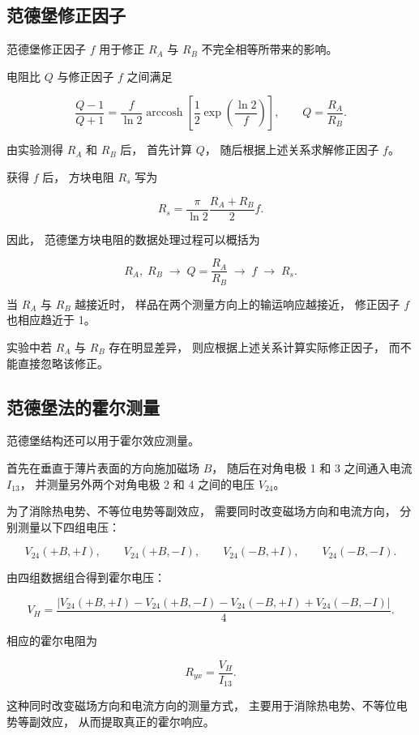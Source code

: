 \documentclass[openany]{book}
\theoremstyle{mydefinition}
\theoremstyle{myplain}
\begin{document}
\subsection{范德堡修正因子}

范德堡修正因子 \(f\)
用于修正 \(R_A\) 与 \(R_B\) 不完全相等所带来的影响。

电阻比 \(Q\) 与修正因子 \(f\) 之间满足

\[
\frac{Q-1}{Q+1}
=
\frac{f}{\ln 2}
\operatorname{arccosh}
\left[
\frac{1}{2}
\exp\left(
\frac{\ln 2}{f}
\right)
\right],
\qquad
Q=\frac{R_A}{R_B}.
\]

由实验测得 \(R_A\) 和 \(R_B\) 后，
首先计算 \(Q\)，
随后根据上述关系求解修正因子 \(f\)。

获得 \(f\) 后，
方块电阻 \(R_s\) 写为

\[
R_s
=
\frac{\pi}{\ln 2}
\frac{R_A+R_B}{2}
f.
\]

因此，
范德堡方块电阻的数据处理过程可以概括为

\[
R_A,\;R_B
\;\longrightarrow\;
Q=\frac{R_A}{R_B}
\;\longrightarrow\;
f
\;\longrightarrow\;
R_s.
\]

当 \(R_A\) 与 \(R_B\) 越接近时，
样品在两个测量方向上的输运响应越接近，
修正因子 \(f\) 也相应趋近于 1。

实验中若 \(R_A\) 与 \(R_B\) 存在明显差异，
则应根据上述关系计算实际修正因子，
而不能直接忽略该修正。


\subsection{范德堡法的霍尔测量}

范德堡结构还可以用于霍尔效应测量。

首先在垂直于薄片表面的方向施加磁场 \(B\)，
随后在对角电极 1 和 3 之间通入电流 \(I_{13}\)，
并测量另外两个对角电极 2 和 4 之间的电压 \(V_{24}\)。

为了消除热电势、不等位电势等副效应，
需要同时改变磁场方向和电流方向，
分别测量以下四组电压：

\[
V_{24}(+B,+I),\qquad
V_{24}(+B,-I),\qquad
V_{24}(-B,+I),\qquad
V_{24}(-B,-I).
\]

由四组数据组合得到霍尔电压：

\[
V_H
=
\frac{
\left|
V_{24}(+B,+I)
-
V_{24}(+B,-I)
-
V_{24}(-B,+I)
+
V_{24}(-B,-I)
\right|
}{4}.
\]

相应的霍尔电阻为

\[
R_{yx}
=
\frac{V_H}{I_{13}}.
\]

这种同时改变磁场方向和电流方向的测量方式，
主要用于消除热电势、不等位电势等副效应，
从而提取真正的霍尔响应。
\end{document}
